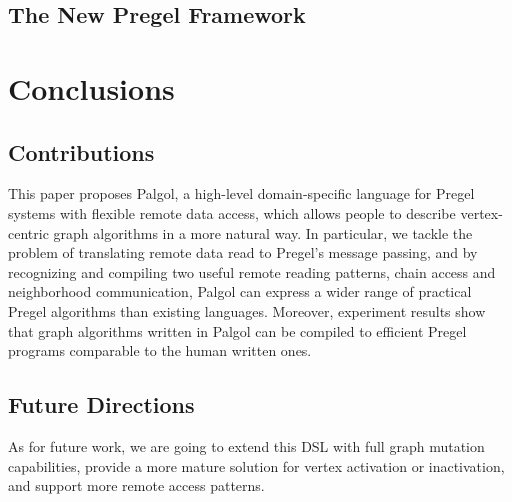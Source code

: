 \documentclass{sokendai_thesis} %
\begin{document}
\section{The New Pregel Framework}

\chapter{Conclusions}
\label{sec:conclusions}

\section{Contributions}

This paper proposes Palgol, a high-level domain-specific language for Pregel systems with flexible remote data access, which allows people to describe vertex-centric graph algorithms in a more natural way.
In particular, we tackle the problem of translating remote data read to Pregel's message passing, and by recognizing and compiling two useful remote reading patterns, chain access and neighborhood communication, Palgol can express a wider range of practical Pregel algorithms than existing languages.
Moreover, experiment results show that graph algorithms written in Palgol can be compiled to efficient Pregel programs comparable to the human written ones.

\section{Future Directions}

As for future work, we are going to extend this DSL with full graph mutation capabilities, provide a more mature solution for vertex activation or inactivation, and support more remote access patterns.





%





\begin{appendices}

%

\end{appendices}
\end{document}
